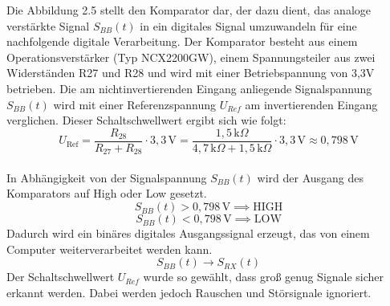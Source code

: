 Die Abbildung 2.5 stellt den Komparator dar, der dazu dient, das analoge verstärkte Signal $S_{BB}(t)$ in ein digitales Signal umzuwandeln für
eine nachfolgende digitale Verarbeitung. Der Komparator besteht aus einem Operationsverstärker (Typ NCX2200GW), einem Spannungsteiler aus zwei Widerständen
R27 und R28 und wird mit einer Betriebspannung von 3,3V betrieben. Die am nichtinvertierenden Eingang anliegende Signalspannung $S_{BB}(t)$ wird mit
einer Referenzspannung $U_{Ref}$ am invertierenden Eingang verglichen. Dieser Schaltschwellwert ergibt sich wie folgt:
\\
\begin{equation}
    U_{\text{Ref}} = \frac{R_{28}}{R_{27} + R_{28}} \cdot 3{,}3\,\text{V}
    = \frac{1{,}5\,\text{k}\Omega}{4{,}7\,\text{k}\Omega + 1{,}5\,\text{k}\Omega} \cdot 3{,}3\,\text{V}
    \approx 0{,}798\,\text{V}
\end{equation}\\
In Abhängigkeit von der Signalspannung $S_{BB}(t)$ wird der Ausgang des Komparators auf High oder Low gesetzt.
\[
S_{BB}(t) > 0{,}798\,\mathrm{V} \implies \text{HIGH}
\]
\[
S_{BB}(t) < 0{,}798\,\mathrm{V} \implies \text{LOW}
\]
Dadurch wird ein binäres digitales Ausgangssignal erzeugt, das von einem Computer weiterverarbeitet werden kann.
\[
S_{BB}(t) \rightarrow S_{RX}(t)
\]
Der Schaltschwellwert $U_{Ref}$ wurde so gewählt, dass groß genug Signale sicher erkannt werden. Dabei werden jedoch Rauschen und Störsignale ignoriert.